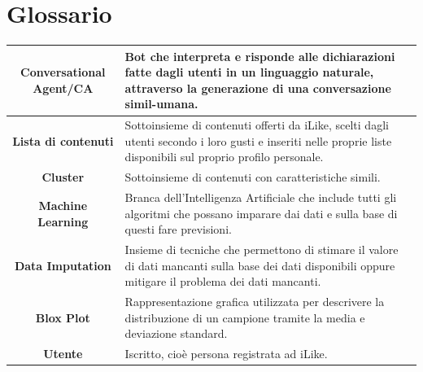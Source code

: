 \documentclass[a4paper, 10pt]{report}
\begin{document}
    \chapter{Glossario}\label{ch:glossario}
        \begin{adjustbox}{width=\columnwidth,center}
            \begin{tabular}{|>{\columncolor{Goldenrod}}c|p{8cm}|}
                \hline \textbf{Conversational Agent/CA} & Bot che interpreta e risponde alle dichiarazioni fatte dagli utenti
                        in un linguaggio naturale, attraverso la  generazione di una conversazione simil-umana.\\
                \hline \textbf{Lista di contenuti} & Sottoinsieme di contenuti offerti da iLike, scelti dagli utenti secondo i loro gusti
                        e inseriti nelle proprie liste disponibili sul proprio profilo personale.\\
                \hline \textbf{Cluster} & Sottoinsieme di contenuti con caratteristiche simili.\\
                \hline \textbf{Machine Learning} & Branca dell'Intelligenza Artificiale che include tutti gli algoritmi
                        che possano imparare dai dati e sulla base di questi fare previsioni.\\
                \hline \textbf{Data Imputation} & Insieme di tecniche che permettono di stimare il valore di dati mancanti
                        sulla base dei dati disponibili oppure mitigare il problema dei dati mancanti.\\
                \hline \textbf{Blox Plot} & Rappresentazione grafica utilizzata per descrivere la distribuzione di un campione
                        tramite la media e deviazione standard.\\
                \hline \textbf{Utente} & Iscritto, cioè persona registrata ad iLike.\\
                \hline
            \end{tabular}
        \end{adjustbox}
\end{document}
